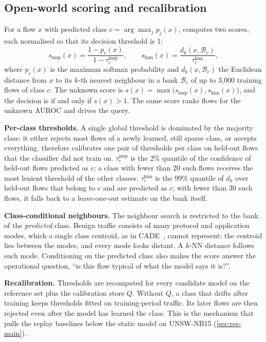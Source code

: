 \subsection{Open-world scoring and recalibration}
\label{sec:unknown}
For a flow $x$ with predicted class $c = \arg\max_j p_j(x)$, \nova{} computes two scores, each normalised so that
its decision threshold is 1:
\begin{equation}
s_{\text{msp}}(x) = \frac{1 - p_c(x)}{1 - \tau^{\text{msp}}_c}, \qquad
s_{\text{knn}}(x) = \frac{d_k\!\left(x, \mathcal{B}_c\right)}{\tau^{\text{knn}}_c},
\end{equation}
where $p_c(x)$ is the maximum softmax probability and $d_k(x,\mathcal{B}_c)$ the Euclidean distance from $x$ to
its $k$-th nearest neighbour in a bank $\mathcal{B}_c$ of up to 3{,}000 training flows of class $c$. The unknown
score is $s(x) = \max\bigl(s_{\text{msp}}(x), s_{\text{knn}}(x)\bigr)$, and the decision is \unk{} if and only if
$s(x) > 1$. The same score ranks flows for the unknown AUROC and drives the query.

\textbf{Per-class thresholds.} A single global threshold is dominated by the majority class: it either rejects
most flows of a newly learned, still sparse class, or accepts everything. \nova{} therefore calibrates one pair
of thresholds per class on held-out flows that the classifier did not train on. $\tau^{\text{msp}}_c$ is the 2\%
quantile of the confidence of held-out flows predicted as $c$; a class with fewer than 20 such flows receives the
most lenient threshold of the other classes. $\tau^{\text{knn}}_c$ is the 99\% quantile of $d_k$ over held-out
flows that belong to $c$ and are predicted as $c$; with fewer than 30 such flows, it falls back to a leave-one-out
estimate on the bank itself.

\textbf{Class-conditional neighbours.} The neighbour search is restricted to the bank of the \emph{predicted}
class. Benign traffic consists of many protocol and application modes, which a single class centroid, as in
CADE~\cite{yang2021cade}, cannot represent: the centroid lies between the modes, and every mode looks distant. A
$k$-NN distance follows each mode. Conditioning on the predicted class also makes the score answer the operational
question, ``is this flow typical of what the model says it is?''.

\textbf{Recalibration.} Thresholds are recomputed for every candidate model on the reference set plus the
calibration store $Q$. Without $Q$, a class that drifts after training keeps thresholds fitted on training-period
traffic. Its later flows are then rejected even after the model has learned the class. This is the mechanism that
pulls the replay baselines below the static model on UNSW-NB15 (\cref{sec:res-main}).

